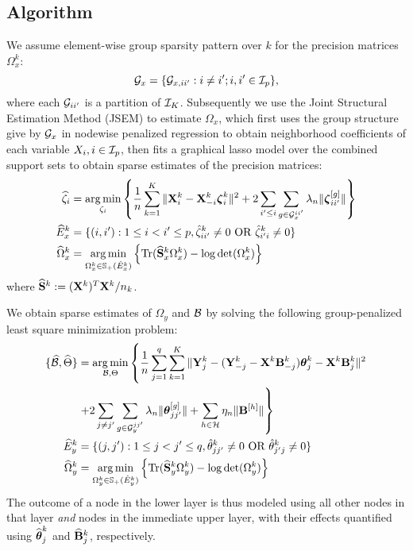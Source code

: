\subsection{Algorithm}
We assume element-wise group sparsity pattern over $k$ for the precision matrices $\Omega_x^k$:
%
\[
{\cal{G}}_x = \{ {\cal{G}}_{x,ii'}: i \neq i'; i, i' \in {\cal{I}}_p \},
\]
%
where each ${\cal{G}}_{ii'}$ is a partition of ${\cal{I}}_K$. Subsequently we use the Joint Structural Estimation Method (JSEM) \citep{MaMichailidis15} to estimate $\Omega_x$, which first uses the group structure give by ${\cal{G}}_x$ in nodewise penalized regression \citep{MeinshausenBuhlmann10} to obtain neighborhood coefficients of each variable $X_i, i \in {\cal{I}}_p$, then fits a graphical lasso model over the combined support sets to obtain sparse estimates of the precision matrices:
%
\begin{align}
\widehat \zeta_i &= \operatorname*{arg\,min}_{\zeta_i} \left\{
\frac{1}{n} \sum_{k=1}^K \| {\mathbf{X}}_i^k - {\mathbf{X}}_{-i}^k {\boldsymbol{\zeta}}_i^k \|^2 +
2 \sum_{i' \leq i} \sum_{g \in {\cal{G}}_x^{ii'}} \lambda_n \| {\boldsymbol{\zeta}}_{ii'}^{[g]} \| \right\} \notag\\
\widehat E_x^k &= \{(i,i'): 1 \leq i < i' \leq p, \hat \zeta_{ii'}^k \neq 0 \text{ OR } \hat \zeta_{i'i}^k \neq 0 \}\notag\\
\widehat \Omega_x^k &= \operatorname*{arg\,min}_{\Omega_x^k \in {\mathbb{S}}_+ (\hat E_x^k)}
\left\{ \operatorname*{Tr} (\widehat {{\mathbf{S}}}_x^k \Omega_x^k ) - \log \det (\Omega_x^k) \right\}
\end{align}
%
where $\widehat {{\mathbf{S}}}^k := ({\mathbf{X}}^k)^T {\mathbf{X}}^k/n_k$.

We obtain sparse estimates of $\Omega_y$ and ${\cal{B}}$ by solving the following group-penalized least square minimization problem:
%
\begin{align}\label{eqn:jmmle-objfun}
\{ \widehat {{\cal{B}}}, \widehat \Theta \} &= 
\operatorname*{arg\,min}_{{\cal{B}}, \Theta} \left\{ \frac{1}{n} \sum_{j=1}^q \sum_{k=1}^K \| {\mathbf{Y}}^k_j - ({\mathbf{Y}}_{-j}^k - {\mathbf{X}}^k {\mathbf{B}}_{-j}^k) {\boldsymbol{\theta}}_j^k - {\mathbf{X}}^k {\mathbf{B}}_j^k \|^2 \right. \notag\\
& \left. + 2 \sum_{j \neq j'} \sum_{g \in {\cal{G}}_y^{jj'}} \lambda_n \| {\boldsymbol{\theta}}_{jj'}^{[g]} \| + \sum_{h \in {\cal{H}}} \eta_n \| {\mathbf{B}}^{[h]} \| \right\} \notag\\
\widehat E_y^k &= \{(j,j'): 1 \leq j < j' \leq q, \hat \theta_{jj'}^k \neq 0 \text{ OR } \hat \theta_{j'j}^k \neq 0 \}\notag\\
\widehat \Omega_y^k &= \operatorname*{arg\,min}_{\Omega_y^k \in {\mathbb{S}}_+ (\hat E_y^k)}
\left\{ \operatorname*{Tr} (\widehat {{\mathbf{S}}}_y^k \Omega_y^k ) - \log \det (\Omega_y^k) \right\}
\end{align}
%
The outcome of a node in the lower layer is thus modeled using all other nodes in that layer {\it and} nodes in the immediate upper layer, with their effects quantified using $\widehat {{\boldsymbol{\theta}}}_j^k$ and $\widehat {{\mathbf{B}}}_j^k$, respectively.

